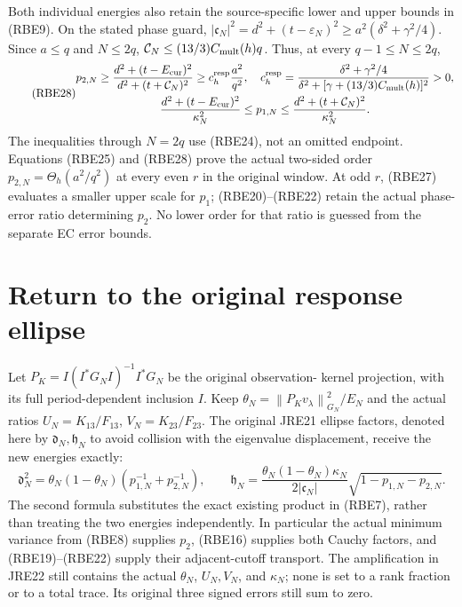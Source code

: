 \documentclass[11pt,a4paper]{article}
\providecommand{\norm}[1]{\left\lVert#1\right\rVert}
\begin{document}
Both individual energies also retain the source-specific lower and
upper bounds in (RBE9). On the stated phase guard,
\(|\mathfrak c_N|^2=d^2+(t-\varepsilon_N)^2
\ge a^2(\delta^2+\gamma^2/4)\). Since \(a\le q\) and
\(N\le2q\),
\(\mathcal C_N\le(13/3)C_{\rm mult}(h)q\).
Thus, at every \(q-1\le N\le2q\),
\begin{equation}\tag{RBE28}
 \begin{gathered}
 p_{2,N}\ge\frac{d^2+(t-E_{\rm cur})^2}
                       {d^2+(t+\mathcal C_N)^2}
 \ge c_h^{\rm resp}\frac{a^2}{q^2},\quad
 c_h^{\rm resp}=\frac{\delta^2+\gamma^2/4}
 {\delta^2+[\gamma+(13/3)C_{\rm mult}(h)]^2}>0,\\
 \frac{d^2+(t-E_{\rm cur})^2}{\kappa_N^2}
 \le p_{1,N}\le
 \frac{d^2+(t+\mathcal C_N)^2}{\kappa_N^2}.
 \end{gathered}
\end{equation}
The inequalities through \(N=2q\) use (RBE24), not an omitted
endpoint. Equations (RBE25) and (RBE28) prove the actual two-sided
order \(p_{2,N}=\Theta_h(a^2/q^2)\) at every even \(r\) in
the original window. At odd \(r\), (RBE27) evaluates a smaller
upper scale for \(p_1\); (RBE20)--(RBE22) retain the actual
phase-error ratio determining \(p_2\). No lower order for that
ratio is guessed from the separate EC error bounds.

\section{Return to the original response ellipse}

Let \(P_K=I(I^*G_NI)^{-1}I^*G_N\) be the original observation-
kernel projection, with its full period-dependent inclusion \(I\).
Keep \(\theta_N=\norm{P_Kv_\lambda}_{G_N}^2/E_N\) and the
actual ratios \(U_N=K_{13}/F_{13}\), \(V_N=K_{23}/F_{23}\).
The original JRE21 ellipse factors, denoted here by
\(\mathfrak d_N,\mathfrak h_N\) to avoid collision with
the eigenvalue displacement, receive the new energies exactly:
\begin{equation}\tag{RBE29}
 \mathfrak d_N^2=\theta_N(1-\theta_N)
                   (p_{1,N}^{-1}+p_{2,N}^{-1}),\qquad
 \mathfrak h_N=
 \frac{\theta_N(1-\theta_N)\kappa_N}{2|\mathfrak c_N|}
                   \sqrt{1-p_{1,N}-p_{2,N}}.
\end{equation}
The second formula substitutes the exact existing product in
(RBE7), rather than treating the two energies independently.
In particular the actual minimum variance from (RBE8) supplies
\(p_2\), (RBE16) supplies both Cauchy factors, and (RBE19)--(RBE22)
supply their adjacent-cutoff transport. The amplification in JRE22
still contains the actual \(\theta_N\), \(U_N,V_N\), and
\(\kappa_N\); none is set to a rank fraction or to a total
trace. Its original three signed errors still sum to zero.
\end{document}
